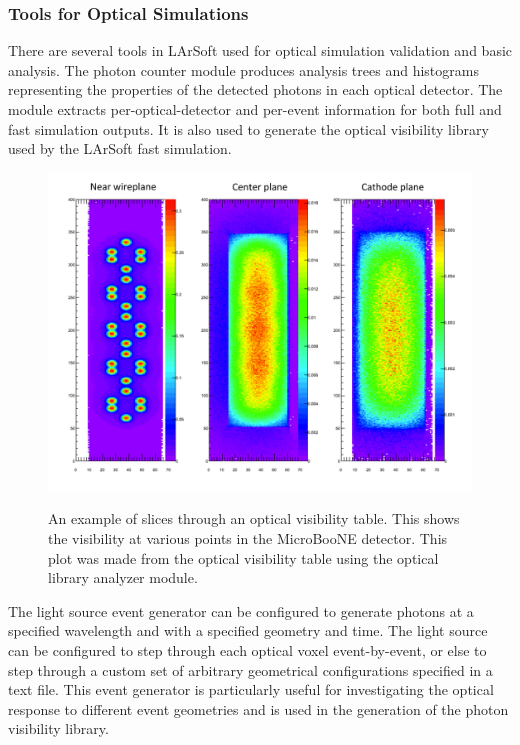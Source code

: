 \documentclass[12pt]{elsarticle}
\begin{document}
\subsubsection{Tools for Optical Simulations}

There are several tools in LArSoft used for optical simulation validation and basic analysis.  The photon counter module produces analysis trees and histograms representing the properties of the detected photons in each optical detector.  The module extracts per-optical-detector and per-event information for both full and fast simulation outputs.  It is also used to generate the optical visibility library used by the LArSoft fast simulation.

\begin{figure}[h]
\centering
\caption{An example of slices through an optical visibility table. This shows the visibility at various points
in the MicroBooNE detector.  This plot was made from the optical visibility table using the optical library
analyzer module.}
\includegraphics[width=6.0in]{./mtrls/imgs/SampleOpticalMap.pdf}
\label{fig:opticalmap}
\end{figure}

The light source event generator can be configured to generate photons at a specified wavelength and with a specified geometry and time.  The light source can be configured to step through each optical voxel event-by-event, or else to step through a custom set of arbitrary geometrical configurations specified in a text file.  This event generator is particularly useful for investigating the optical response to different event geometries and is used in the generation of the photon visibility library.
\end{document}
